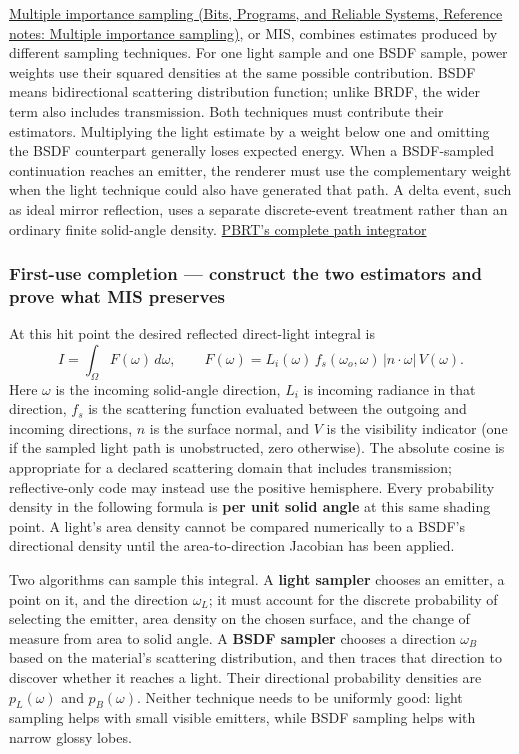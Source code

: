 \href{../01-Bits-Programs-and-Reliable-Systems/main.pdf\#nameddest=appendix-ca8898faf1a6}{Multiple importance sampling (Bits, Programs, and Reliable Systems, Reference notes: Multiple importance sampling)}, or MIS, combines estimates produced by different sampling techniques. For one light sample and one BSDF sample, power weights use their squared densities at the same possible contribution. BSDF means bidirectional scattering distribution function; unlike BRDF, the wider term also includes transmission. Both techniques must contribute their estimators. Multiplying the light estimate by a weight below one and omitting the BSDF counterpart generally loses expected energy. When a BSDF-sampled continuation reaches an emitter, the renderer must use the complementary weight when the light technique could also have generated that path. A delta event, such as ideal mirror reflection, uses a separate discrete-event treatment rather than an ordinary finite solid-angle density. \href{https://pbr-book.org/4ed/Light_Transport_I_Surface_Reflection/A_Better_Path_Tracer}{PBRT's complete path integrator}

\subsubsection{First-use completion --- construct the two estimators and prove what MIS preserves}\label{03-visual-computing-i-ch007-first-use-completion-construct-the-two-estimators-and-prove-what-mis-preserves}

At this hit point the desired reflected direct-light integral is \[
I=\int_{\Omega}F(\omega)\,d\omega,\qquad
F(\omega)=L_i(\omega)\,f_s(\omega_o,\omega)\,
  |n\cdot\omega|\,V(\omega).
\] Here \(\omega\) is the incoming solid-angle direction, \(L_i\) is incoming radiance in that direction, \(f_s\) is the scattering function evaluated between the outgoing and incoming directions, \(n\) is the surface normal, and \(V\) is the visibility indicator (one if the sampled light path is unobstructed, zero otherwise). The absolute cosine is appropriate for a declared scattering domain that includes transmission; reflective-only code may instead use the positive hemisphere. Every probability density in the following formula is \textbf{per unit solid angle} at this same shading point. A light's area density cannot be compared numerically to a BSDF's directional density until the area-to-direction Jacobian has been applied.

Two algorithms can sample this integral. A \textbf{light sampler} chooses an emitter, a point on it, and the direction \(\omega_L\); it must account for the discrete probability of selecting the emitter, area density on the chosen surface, and the change of measure from area to solid angle. A \textbf{BSDF sampler} chooses a direction \(\omega_B\) based on the material's scattering distribution, and then traces that direction to discover whether it reaches a light. Their directional probability densities are \(p_L(\omega)\) and \(p_B(\omega)\). Neither technique needs to be uniformly good: light sampling helps with small visible emitters, while BSDF sampling helps with narrow glossy lobes.

